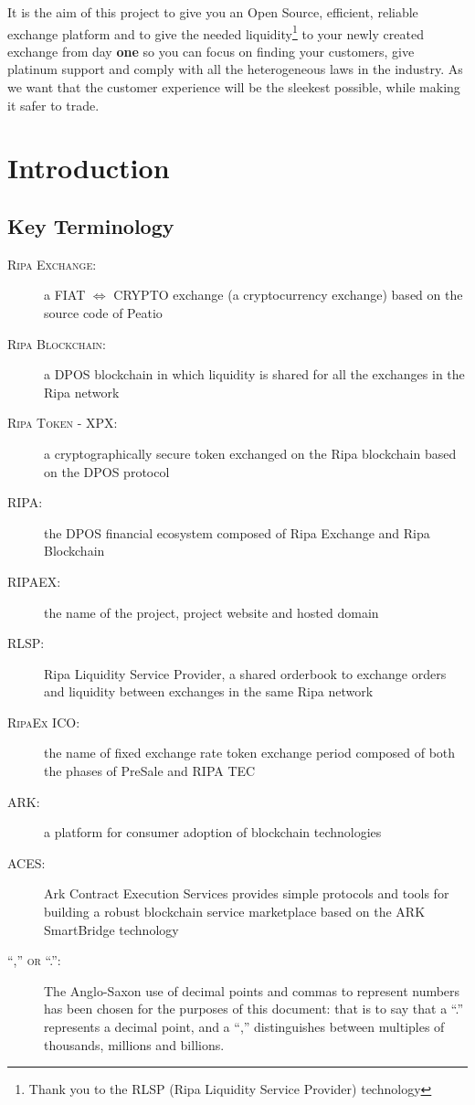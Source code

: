 \documentclass[11pt,fleqn,oneside]{book} %
\begin{document}
It is the aim of this project to give you an Open Source, efficient, reliable exchange platform and to
give the needed liquidity\footnote{Thank you to the RLSP (Ripa Liquidity Service Provider) technology} to your newly created 
exchange from day \textbf{one} so you can focus on finding your customers, give platinum support and comply with all the heterogeneous 
laws in the industry. 
As we want that the customer experience will be the sleekest possible, while making it safer to trade.\\
\usechapterimagetrue




\chapter{Introduction}

\section{Key Terminology}
	\begin{description}
		\item[\textsc{Ripa Exchange:}] a FIAT $\Leftrightarrow$ CRYPTO exchange (a cryptocurrency exchange) based on the source code
		of Peatio \cite{peatio}
		\item[\textsc{Ripa Blockchain:}] a DPOS blockchain in which liquidity is shared for all the exchanges in the Ripa network
		\item[\textsc{Ripa Token - XPX:}] a cryptographically secure token exchanged on the Ripa blockchain based on the DPOS protocol
		\item[\textsc{RIPA:}] the DPOS financial ecosystem composed of Ripa Exchange and Ripa Blockchain
		\item[\textsc{RIPAEX:}] the name of the project, project website and hosted domain
		\item[\textsc{RLSP:}] Ripa Liquidity Service Provider, a shared orderbook to exchange orders and liquidity between exchanges in the same Ripa network
		\item[\textsc{RipaEx ICO:}] the name of fixed exchange rate token exchange period composed of both the phases of PreSale and RIPA TEC
		\item[\textsc{ARK:}] a platform for consumer adoption of blockchain technologies \cite{ark}
		\item[\textsc{ACES:}] Ark Contract Execution Services \cite{aces} provides simple protocols and tools for building a robust 
		blockchain service marketplace based on the ARK SmartBridge technology
		\item[\textsc{``,'' or ``.'':}] The Anglo-Saxon use of decimal points and commas to represent numbers has
		been chosen for the purposes of this document: that is to say that a “.” represents a decimal point, and a “,”
		distinguishes between multiples of thousands, millions and billions.
    \end{description}
\end{document}

